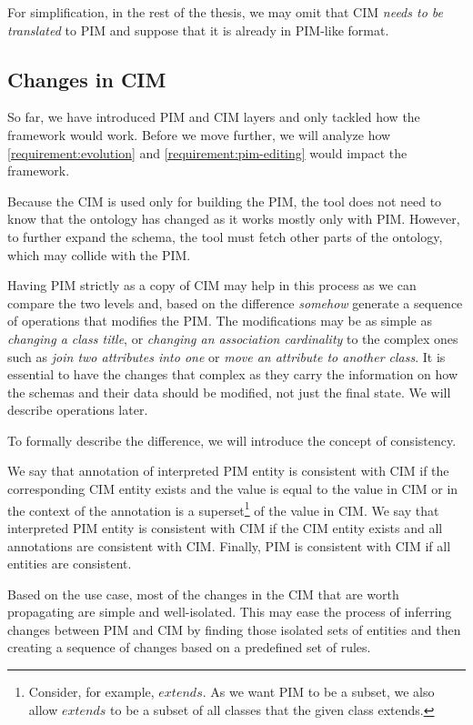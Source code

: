 For simplification, in the rest of the thesis, we may omit that CIM \textit{needs to be translated} to PIM and suppose that it is already in PIM-like format.

\subsection{Changes in CIM}

So far, we have introduced PIM and CIM layers and only tackled how the framework would work. Before we move further, we will analyze how \autoref{requirement:evolution} and \ref{requirement:pim-editing} would impact the framework.

Because the CIM is used only for building the PIM, the tool does not need to know that the ontology has changed as it works mostly only with PIM. However, to further expand the schema, the tool must fetch other parts of the ontology, which may collide with the PIM.

Having PIM strictly as a copy of CIM may help in this process as we can compare the two levels and, based on the difference \textit{somehow} generate a sequence of operations that modifies the PIM. The modifications may be as simple as \textit{changing a class title}, or \textit{changing an association cardinality} to the complex ones such as \textit{join two attributes into one} or \textit{move an attribute to another class}. It is essential to have the changes that complex as they carry the information on how the schemas and their data should be modified, not just the final state. We will describe operations later.

To formally describe the difference, we will introduce the concept of consistency.

\begin{definition}[consistency]
    We say that {annotation of interpreted PIM entity is consistent with CIM} if the corresponding CIM entity exists and the value is equal to the value in CIM or in the context of the annotation is a superset\footnote{Consider, for example, $extends$. As we want PIM to be a subset, we also allow $extends$ to be a subset of all classes that the given class extends.} of the value in CIM. We say that {interpreted PIM entity is consistent with CIM} if the CIM entity exists and all annotations are consistent with CIM. Finally, {PIM is consistent with CIM} if all entities are consistent.
\end{definition}

Based on the use case, most of the changes in the CIM that are worth propagating are simple and well-isolated. This may ease the process of inferring changes between PIM and CIM by finding those isolated sets of entities and then creating a sequence of changes based on a predefined set of rules.

